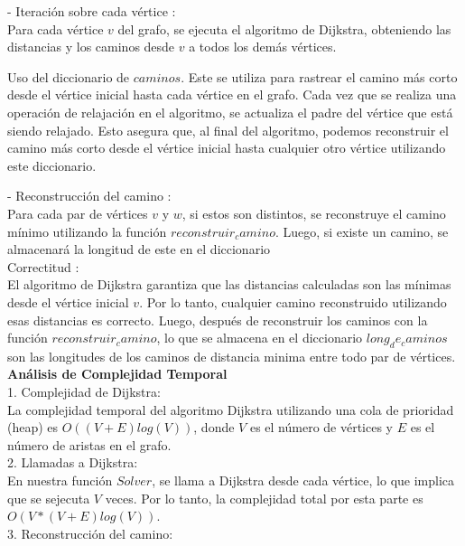 \documentclass[
10pt, %
a4paper, %
oneside, %
headinclude,footinclude, %
BCOR5mm, %
]{scrartcl}
\begin{document}
- Iteración sobre cada vértice :\\ 
Para cada vértice $v$ del grafo, se ejecuta el algoritmo de Dijkstra, obteniendo las distancias y los caminos desde $v$
a todos los demás vértices.

Uso del diccionario de $caminos$. Este se utiliza para rastrear el camino más corto desde el vértice inicial hasta cada 
vértice en el grafo. Cada vez que se realiza una operación de relajación en el algoritmo, se actualiza el padre del vértice 
que está siendo relajado. Esto asegura que, al final del algoritmo, podemos reconstruir el camino más corto desde el vértice inicial
hasta cualquier otro vértice utilizando este diccionario.


- Reconstrucción del camino : \\
Para cada par de vértices $v$ y $w$, si estos son distintos, se reconstruye el camino mínimo utilizando la función $reconstruir_camino$. Luego, 
si existe un camino, se almacenará la longitud de este en el diccionario\\


Correctitud : \\
El algoritmo de Dijkstra garantiza que las distancias calculadas son las mínimas desde el vértice inicial $v$. Por lo tanto, 
cualquier camino reconstruido utilizando esas distancias es correcto. Luego, después de reconstruir los caminos con la función $reconstruir_camino$, 
lo que se almacena en el diccionario $long_de_caminos$ son las longitudes de los caminos de distancia minima entre todo par de 
vértices.\\


\textbf{Análisis de Complejidad Temporal}\\

1. Complejidad de Dijkstra:\\

La complejidad temporal del algoritmo Dijkstra utilizando una cola de prioridad (heap) es $O((V+E)log(V))$, donde $V$ es el número de vértices y $E$ es el número de 
aristas en el grafo.\\

2. Llamadas a Dijkstra:\\

En nuestra función $Solver$, se llama a Dijkstra desde cada vértice, lo que implica que se sejecuta $V$ veces. 
Por lo tanto, la complejidad total por esta parte es $O(V*(V+E)log(V))$. \\

3. Reconstrucción del camino:\\
\end{document}
